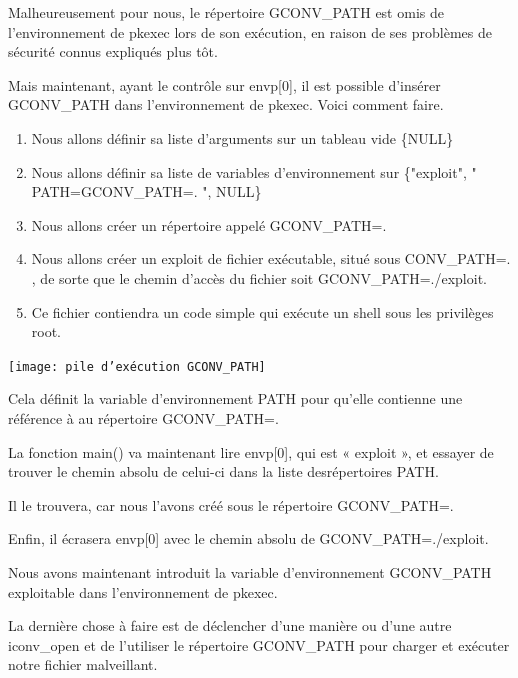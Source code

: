 \documentclass[12pt,a4paper]{article}
\begin{document}
\begin{flushleft}
            \item Malheureusement pour nous, le répertoire GCONV\_PATH est omis de l’environnement de pkexec lors de son exécution, en raison de ses problèmes de sécurité connus expliqués plus tôt.
            \item Mais maintenant, ayant le contrôle sur envp[0], il est possible d'insérer GCONV\_PATH dans l'environnement de pkexec. Voici comment faire.
            \begin{enumerate}
                \item Nous allons définir sa liste d’arguments sur un tableau vide \{NULL\}
                \item Nous allons définir sa liste de variables d’environnement sur \{"exploit", " PATH=GCONV\_PATH=. ", NULL\}
                \item Nous allons créer un répertoire appelé GCONV\_PATH=.
                \item Nous allons créer un exploit de fichier exécutable, situé sous CONV\_PATH=. , de sorte que le chemin d’accès du fichier soit GCONV\_PATH=./exploit.
                \item Ce fichier contiendra un code simple qui exécute un shell sous les privilèges root.
            \end{enumerate}
            \begin{center}
                \texttt{[image: pile d'exécution GCONV\_PATH]} \cite{CVE2021425}
            \end{center}
            \item Cela définit la variable d’environnement PATH pour qu’elle contienne une référence à au répertoire GCONV\_PATH=. 
            \item La fonction main() va maintenant lire envp[0], qui est « exploit », et essayer de trouver le chemin absolu de celui-ci dans la liste desrépertoires PATH. 
            \item Il le trouvera, car nous l’avons créé sous le répertoire GCONV\_PATH=. 
            \item Enfin, il écrasera envp[0] avec le chemin absolu de GCONV\_PATH=./exploit.
            \item Nous avons maintenant introduit la variable d’environnement GCONV\_PATH exploitable dans l’environnement de pkexec. 
            \item La dernière chose à faire est de déclencher d’une manière ou d’une autre iconv\_open et de l’utiliser le répertoire GCONV\_PATH pour charger et exécuter notre fichier malveillant.

\end{flushleft}
\end{document}
